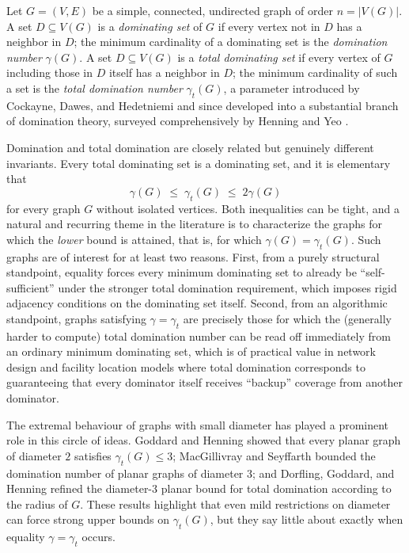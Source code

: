 \documentclass[12pt]{amsart}
\theoremstyle{plain}
\theoremstyle{definition}
\begin{document}
Let $G=(V,E)$ be a simple, connected, undirected graph of order $n=|V(G)|$. A set $D \subseteq V(G)$ is a \emph{dominating set} of $G$ if every vertex not in $D$ has a neighbor in $D$; the minimum cardinality of a dominating set is the \emph{domination number} $\gamma(G)$. A set $D\subseteq V(G)$ is a \emph{total dominating set} if every vertex of $G$ including those in $D$ itself has a neighbor in $D$; the minimum cardinality of such a set is the \emph{total domination number} $\gamma_t(G)$, a parameter introduced by Cockayne, Dawes, and Hedetniemi \cite{Cockayne-Dawes-Hedetniemi-1980} and since developed into a substantial branch of domination theory, surveyed comprehensively by Henning and Yeo \cite{HenningYeo-book}.

Domination and total domination are closely related but genuinely different invariants. Every total dominating set is a dominating set, and it is elementary that
\[
\gamma(G) \;\le\; \gamma_t(G) \;\le\; 2\gamma(G)
\]
for every graph $G$ without isolated vertices. Both inequalities can be tight, and a natural and recurring theme in the literature is to characterize the graphs for which the \emph{lower} bound is attained, that is, for which
$\gamma(G) = \gamma_t(G).$
Such graphs are of interest for at least two reasons. First, from a purely structural standpoint, equality forces every minimum dominating set to already be ``self-sufficient'' under the stronger total domination requirement, which imposes rigid adjacency conditions on the dominating set itself. Second, from an algorithmic standpoint, graphs satisfying $\gamma=\gamma_t$ are precisely those for which the (generally harder to compute) total domination number can be read off immediately from an ordinary minimum dominating set, which is of practical value in network design and facility location models where total domination corresponds to guaranteeing that every dominator itself receives ``backup'' coverage from another dominator.

The extremal behaviour of graphs with small diameter has played a prominent role in this circle of ideas. Goddard and Henning \cite{GoddardHenning2002} showed that every planar graph of diameter $2$ satisfies $\gamma_t(G) \le 3$; MacGillivray and Seyffarth \cite{MacGillivraySeyffarth1996} bounded the domination number of planar graphs of diameter $3$; and Dorfling, Goddard, and Henning \cite{DorflingGoddardHenning2006} refined the diameter-$3$ planar bound for total domination according to the radius of $G$. These results highlight that even mild restrictions on diameter can force strong upper bounds on $\gamma_t(G)$, but they say little about exactly when equality $\gamma=\gamma_t$ occurs.
\end{document}

